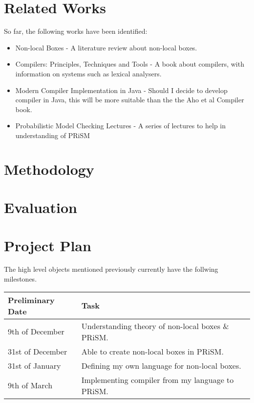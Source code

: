 \documentclass[11pt, a4paper]{article}
\begin{document}

\section{Related Works} %
\label{sec:related_works}
So far, the following works have been identified:
\begin{itemize}
    \item Non-local Boxes\cite{nlb_lamontague} - A literature review about
    non-local boxes.
    \item Compilers: Principles, Techniques and Tools\cite{dragon_compiler} - A
    book about compilers, with information on systems such as lexical analysers.
    \item Modern Compiler Implementation in Java\cite{java_compiler} - Should I
    decide to develop compiler in Java, this will be more suitable than the
    the Aho et al Compiler book.
    \item Probabilistic Model Checking Lectures\cite{prism_lectures} - A series
    of lectures to help in understanding of PRiSM
\end{itemize}


\section{Methodology} %
\label{sec:methodology}


\section{Evaluation} %
\label{sec:evaluation}


\section{Project Plan} %
\label{sec:project_plan}
The high level objects mentioned previously currently have the follwing
milestones.

\begin{center}
    \begin{tabular}{l | p{7.5cm}}
        Preliminary Date & Task \\
        \hline
        9th of December & Understanding theory of non-local boxes \& PRiSM. \\

        31st of December & Able to create non-local boxes in PRiSM. \\

        31st of January & Defining my own language for non-local boxes. \\

        9th of March & Implementing compiler from my language to PRiSM. \\
\end{tabular}
\end{center}
\end{document}
